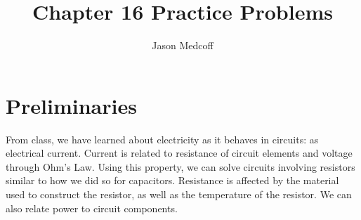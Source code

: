 \documentclass{article}
\title{Chapter 16 Practice Problems}
\author{Jason Medcoff}
\date{}
\begin{document}
	
	\maketitle
	
	\section{Preliminaries}
	
	From class, we have learned about electricity as it behaves in circuits: as electrical current. Current is related to resistance of circuit elements and voltage through Ohm's Law. Using this property, we can solve circuits involving resistors similar to how we did so for capacitors. Resistance is affected by the material used to construct the resistor, as well as the temperature of the resistor. We can also relate power to circuit components.
\end{document}
